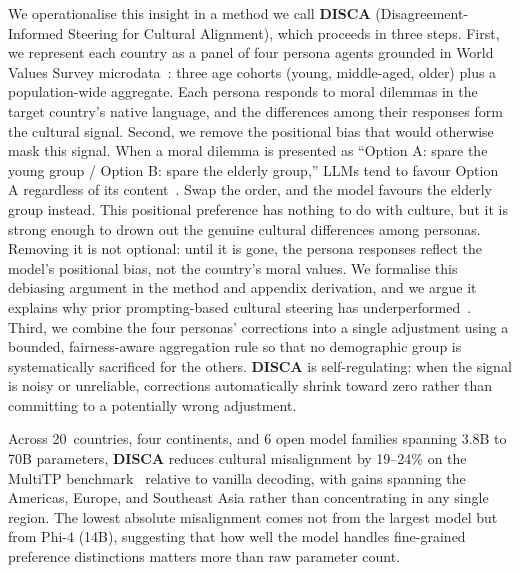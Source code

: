 \documentclass{article}
\begin{document}
We operationalise this insight in a method we call
\textbf{DISCA} (Disagreement-Informed Steering for Cultural Alignment), which proceeds in three steps. First, we represent each country as a panel of four persona agents grounded in World Values Survey microdata~\citep{haerpfer2022wvs}: three age cohorts (young, middle-aged, older) plus a population-wide aggregate. Each persona responds to moral dilemmas in the target country's native language, and the differences among their responses form the
cultural signal. Second, we remove the positional bias that would otherwise mask this signal. When a moral dilemma is presented as ``Option A: spare the young group / Option B: spare the elderly group,'' LLMs tend to favour Option A regardless of its content~\citep{liu2024lost}. Swap the order, and the model favours the elderly group instead. This positional preference has nothing to do with culture, but it is strong enough to drown out the genuine cultural differences among personas. Removing it is not optional: until it is gone, the persona responses reflect the model's positional bias, not the country's moral values. We formalise this debiasing argument in the method and appendix derivation, and we argue it explains why prior prompting-based cultural steering has underperformed~\citep{jin2025multitp}. Third, we combine the four personas' corrections into a single adjustment using a bounded, fairness-aware aggregation rule so that no demographic group is systematically sacrificed for the others. \textbf{DISCA} is self-regulating: when the signal is noisy or unreliable, corrections automatically shrink toward zero rather than committing to a potentially wrong adjustment.


Across 20~countries, four continents, and 6 open model families spanning 3.8B to 70B parameters, \textbf{DISCA} reduces cultural misalignment by 19--24\% on the MultiTP benchmark~\citep{jin2025multitp} relative to vanilla decoding, with gains spanning the Americas, Europe, and Southeast Asia rather than concentrating in any single region. The lowest absolute misalignment comes not from the largest model but from Phi-4 (14B), suggesting that how well the model handles fine-grained preference distinctions matters more than raw parameter count.
\end{document}
